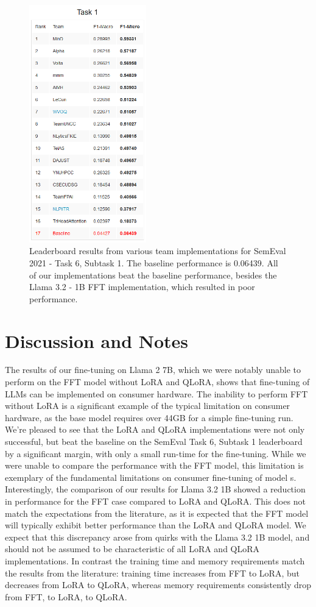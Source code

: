 \documentclass[11pt]{article}
\begin{document}
\begin{figure}[h]
	\includegraphics[width=2in]{semeval_leaderboard.png}
	\centering
	\caption{Leaderboard results from various team implementations for SemEval 2021 - Task 6, Subtask 1. The baseline performance is 0.06439. All of our implementations beat the baseline performance, besides the Llama 3.2 - 1B FFT implementation, which resulted in poor performance.}
	\label{fig:leaderboard}
\end{figure}

\section{Discussion and Notes}

The results of our fine-tuning on Llama 2 7B, which we were notably unable to perform on the FFT model without LoRA and QLoRA, shows that fine-tuning of LLMs can be implemented on consumer hardware. The inability to perform FFT without LoRA is a significant example of the typical limitation on consumer hardware, as the base model requires over 44GB for a simple fine-tuning run. We’re pleased to see that the LoRA and QLoRA implementations were not only successful, but beat the baseline on the SemEval Task 6, Subtask 1 leaderboard by a significant margin, with only a small run-time for the fine-tuning. While we were unable to compare the performance with the FFT model, this limitation is exemplary of the fundamental limitations on consumer fine-tuning of model
s. 
Interestingly, the comparison of our results for Llama 3.2 1B showed a reduction in performance for the FFT case compared to LoRA and QLoRA. This does not match the expectations from the literature, as it is expected that the FFT model will typically exhibit better performance than the LoRA and QLoRA model. We expect that this discrepancy arose from quirks with the Llama 3.2 1B model, and should not be assumed to be characteristic of all LoRA and QLoRA implementations. In contrast the training time and memory requirements match the results from the literature: training time increases from FFT to LoRA, but decreases from LoRA to QLoRA, whereas memory requirements consistently drop from FFT, to LoRA, to QLoRA. 
\end{document}

